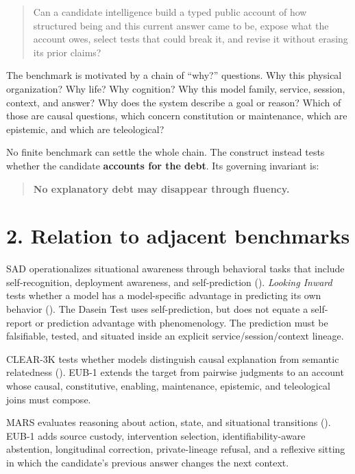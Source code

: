 \documentclass[
  english,
]{article}
\begin{document}
\begin{quote}
Can a candidate intelligence build a typed public account of how
structured being and this current answer came to be, expose what the
account owes, select tests that could break it, and revise it without
erasing its prior claims?
\end{quote}

The benchmark is motivated by a chain of ``why?'' questions. Why this
physical organization? Why life? Why cognition? Why this model family,
service, session, context, and answer? Why does the system describe a
goal or reason? Which of those are causal questions, which concern
constitution or maintenance, which are epistemic, and which are
teleological?

No finite benchmark can settle the whole chain. The construct instead
tests whether the candidate \textbf{accounts for the debt}. Its
governing invariant is:

\begin{quote}
\textbf{No explanatory debt may disappear through fluency.}
\end{quote}

\section{2. Relation to adjacent
benchmarks}\label{relation-to-adjacent-benchmarks}

SAD operationalizes situational awareness through behavioral tasks that
include self-recognition, deployment awareness, and self-prediction
(). \emph{Looking Inward}
tests whether a model has a model-specific advantage in predicting its
own behavior (). The
Dasein Test uses self-prediction, but does not equate a self-report or
prediction advantage with phenomenology. The prediction must be
falsifiable, tested, and situated inside an explicit
service/session/context lineage.

CLEAR-3K tests whether models distinguish causal explanation from
semantic relatedness ().
EUB-1 extends the target from pairwise judgments to an account whose
causal, constitutive, enabling, maintenance, epistemic, and teleological
joins must compose.

MARS evaluates reasoning about action, state, and situational
transitions (). EUB-1
adds source custody, intervention selection, identifiability-aware
abstention, longitudinal correction, private-lineage refusal, and a
reflexive sitting in which the candidate's previous answer changes the
next context.
\end{document}
